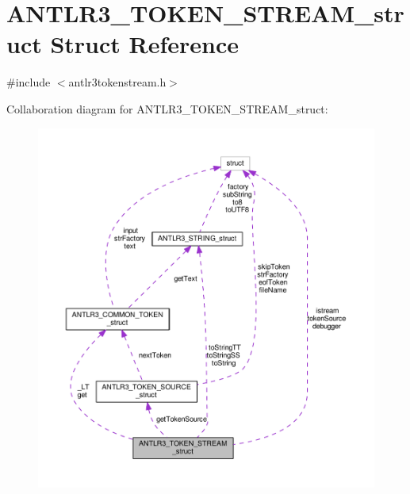 \hypertarget{struct_a_n_t_l_r3___t_o_k_e_n___s_t_r_e_a_m__struct}{\section{A\-N\-T\-L\-R3\-\_\-\-T\-O\-K\-E\-N\-\_\-\-S\-T\-R\-E\-A\-M\-\_\-struct Struct Reference}
\label{struct_a_n_t_l_r3___t_o_k_e_n___s_t_r_e_a_m__struct}
}


{\ttfamily \#include $<$antlr3tokenstream.\-h$>$}



Collaboration diagram for A\-N\-T\-L\-R3\-\_\-\-T\-O\-K\-E\-N\-\_\-\-S\-T\-R\-E\-A\-M\-\_\-struct\-:
\nopagebreak
\begin{figure}[H]
\begin{center}
\leavevmode
\includegraphics[width=350pt]{struct_a_n_t_l_r3___t_o_k_e_n___s_t_r_e_a_m__struct__coll__graph}
\end{center}
\end{figure}
